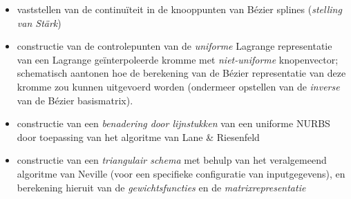 \documentclass{report}
\begin{document}
\begin{itemize}
		\item {} vaststellen van de continuïteit in de knooppunten van Bézier splines (\textit{stelling van Stärk})
		\item {} constructie van de controlepunten van de \textit{uniforme} Lagrange representatie van een Lagrange geïnterpoleerde kromme met \textit{niet-uniforme} knopenvector; schematisch aantonen hoe de berekening van de Bézier representatie van deze kromme zou kunnen uitgevoerd worden (ondermeer opstellen van de \textit{inverse} van de Bézier basismatrix).
		\item {} constructie van een  \textit{benadering door lijnstukken} van een uniforme NURBS door toepassing van het algoritme van Lane \& Riesenfeld
		\item {} constructie van een \textit{triangulair schema} met behulp van het veralgemeend algoritme van Neville (voor een specifieke configuratie van inputgegevens), en berekening hieruit van de \textit{gewichtsfuncties} en de \textit{matrixrepresentatie}
		
	\end{itemize}
	
\end{document}
